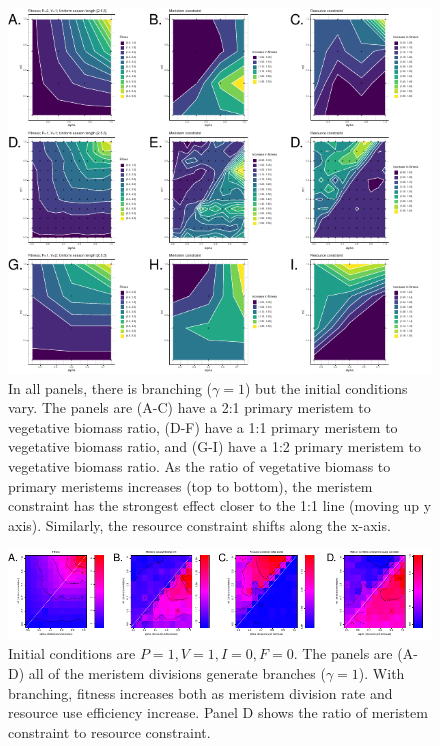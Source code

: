 \documentclass[12pt, oneside,a4paper]{article}   	%
\begin{document}
\begin{figure}[h]
	\includegraphics[page=1,width=\textwidth]{figure-3} %
        \caption{ In all panels, there is branching ($\gamma=1$) but the initial conditions vary. The panels are (A-C) have a 2:1 primary meristem to vegetative biomass ratio, (D-F) have a 1:1 primary meristem to vegetative biomass ratio, and (G-I) have a 1:2 primary meristem to vegetative biomass ratio. As the ratio of vegetative biomass to primary meristems increases (top to bottom), the meristem constraint has the strongest effect closer to the 1:1 line (moving up y axis). Similarly, the resource constraint shifts along the x-axis.   }
        \label{fig:intro-figure}
\end{figure}

\begin{figure}[h]
	\includegraphics[page=1,width=\textwidth]{figure-4} %
        \caption{ Initial conditions are $P=1, V=1, I=0, F=0$. The panels are (A-D) all of the meristem divisions generate branches ($\gamma=1$). With branching, fitness increases both as meristem division rate and resource use efficiency increase. Panel D shows the ratio of meristem constraint to resource constraint.  }
        \label{fig:intro-figure}
\end{figure}
\end{document}
